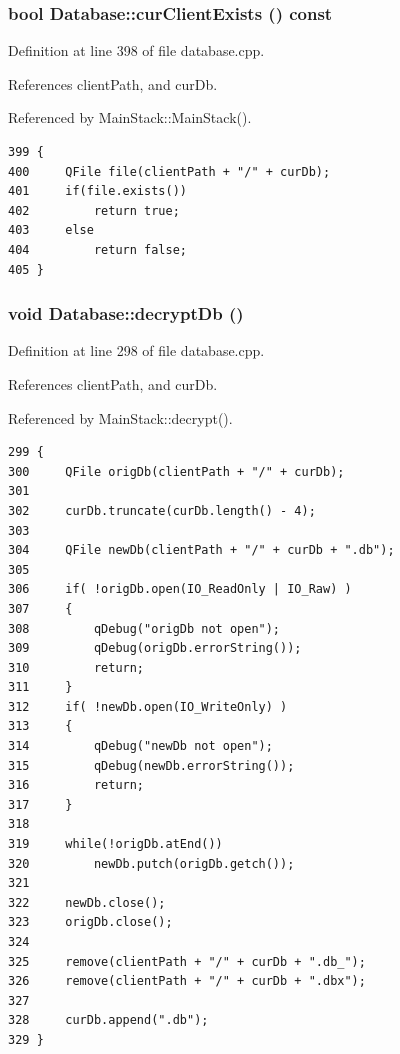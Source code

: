 \hypertarget{classDatabase_a12}{
\subsubsection[curClientExists]{\setlength{\rightskip}{0pt plus 5cm}bool Database::cur\-Client\-Exists () const}}
\label{classDatabase_a12}


Definition at line 398 of file database.cpp.

References client\-Path, and cur\-Db.

Referenced by Main\-Stack::Main\-Stack().

\footnotesize\begin{verbatim}399 {
400     QFile file(clientPath + "/" + curDb);
401     if(file.exists())
402         return true;
403     else
404         return false;
405 }
\end{verbatim}\normalsize 


\hypertarget{classDatabase_a6}{
\subsubsection[decryptDb]{\setlength{\rightskip}{0pt plus 5cm}void Database::decrypt\-Db ()}}
\label{classDatabase_a6}


Definition at line 298 of file database.cpp.

References client\-Path, and cur\-Db.

Referenced by Main\-Stack::decrypt().

\footnotesize\begin{verbatim}299 {
300     QFile origDb(clientPath + "/" + curDb);
301 
302     curDb.truncate(curDb.length() - 4);
303 
304     QFile newDb(clientPath + "/" + curDb + ".db");
305 
306     if( !origDb.open(IO_ReadOnly | IO_Raw) )
307     {
308         qDebug("origDb not open");
309         qDebug(origDb.errorString());
310         return;
311     }
312     if( !newDb.open(IO_WriteOnly) )
313     {
314         qDebug("newDb not open");
315         qDebug(newDb.errorString());
316         return;
317     }
318     
319     while(!origDb.atEnd())
320         newDb.putch(origDb.getch());
321     
322     newDb.close();
323     origDb.close();
324 
325     remove(clientPath + "/" + curDb + ".db_");
326     remove(clientPath + "/" + curDb + ".dbx");
327 
328     curDb.append(".db");
329 }
\end{verbatim}\normalsize 


